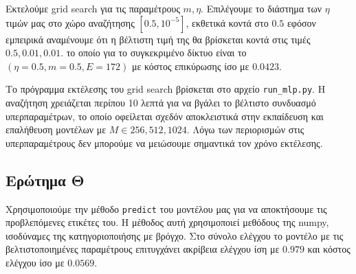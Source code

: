 \documentclass{article}
\newcommand{\code}{\texttt}
\begin{document}
Εκτελούμε grid search για τις παραμέτρους $m, \eta$. Επιλέγουμε το διάστημα των $\eta$ τιμών μας στο χώρο αναζήτησης $[0.5, 10^{-5}]$, εκθετικά κοντά στο $0.5$ εφόσον εμπειρικά αναμένουμε ότι η βέλτιστη τιμή της θα βρίσκεται κοντά στις τιμές $0.5, 0.01, 0.01$.  το οποίο για το συγκεκριμένο δίκτυο είναι το $(\eta=0.5, m=0.5, E=172)$ με κόστος επικύρωσης ίσο με $0.0423$.

Το πρόγραμμα εκτέλεσης του grid search βρίσκεται στο αρχείο \code{run\_mlp.py}. Η αναζήτηση χρειάζεται περίπου 10 λεπτά για να βγάλει το βέλτιστο συνδυασμό υπερπαραμέτρων, το οποίο οφείλεται σχεδόν αποκλειστικά στην εκπαίδευση και επαλήθευση μοντέλων με $M \in {256, 512, 1024}$. Λόγω των περιορισμών στις υπερπαραμέτρους δεν μπορούμε να μειώσουμε σημαντικά τον χρόνο εκτέλεσης.


\subsection{Ερώτημα Θ}

Χρησιμοποιούμε την μέθοδο \code{predict} του μοντέλου μας για να αποκτήσουμε τις προβλεπόμενες ετικέτες του. Η μέθοδος αυτή χρησιμοποιεί μεθόδους της numpy, ισοδύναμες της κατηγοριοποιήσης με βρόγχο. Στο σύνολο ελέγχου το μοντέλο με τις βελτιστοποιημένες παραμέτρους επιτυγχάνει ακρίβεια ελέγχου ίση με $0.979$ και κόστος ελέγχου ίσο με $0.0569$.

\printbibliography
\end{document}
